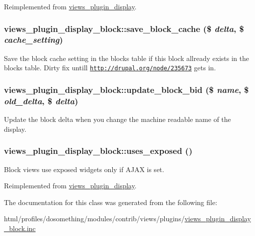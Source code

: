 Reimplemented from \hyperlink{classviews__plugin__display_a7a2f2aeedfc14816815e3ce65a61aedf}{views\_\-plugin\_\-display}.\hypertarget{classviews__plugin__display__block_a58ba8f810894ad2e7c43c49552005ceb}{
\subsubsection[{save\_\-block\_\-cache}]{\setlength{\rightskip}{0pt plus 5cm}views\_\-plugin\_\-display\_\-block::save\_\-block\_\-cache (\$ {\em delta}, \/  \$ {\em cache\_\-setting})}}
\label{classviews__plugin__display__block_a58ba8f810894ad2e7c43c49552005ceb}
Save the block cache setting in the blocks table if this block allready exists in the blocks table. Dirty fix untill \href{http://drupal.org/node/235673}{\tt http://drupal.org/node/235673} gets in. \hypertarget{classviews__plugin__display__block_a7c66bc2e467112a09d809d9d5d2baa20}{
\subsubsection[{update\_\-block\_\-bid}]{\setlength{\rightskip}{0pt plus 5cm}views\_\-plugin\_\-display\_\-block::update\_\-block\_\-bid (\$ {\em name}, \/  \$ {\em old\_\-delta}, \/  \$ {\em delta})}}
\label{classviews__plugin__display__block_a7c66bc2e467112a09d809d9d5d2baa20}
Update the block delta when you change the machine readable name of the display. \hypertarget{classviews__plugin__display__block_ab0995994a4c7436de2790c7ad8d7ea74}{
\subsubsection[{uses\_\-exposed}]{\setlength{\rightskip}{0pt plus 5cm}views\_\-plugin\_\-display\_\-block::uses\_\-exposed ()}}
\label{classviews__plugin__display__block_ab0995994a4c7436de2790c7ad8d7ea74}
Block views use exposed widgets only if AJAX is set. 

Reimplemented from \hyperlink{classviews__plugin__display_a5bfcb22187618f52bea9ea626aff18a4}{views\_\-plugin\_\-display}.

The documentation for this class was generated from the following file:\begin{DoxyCompactItemize}
\item 
html/profiles/dosomething/modules/contrib/views/plugins/\hyperlink{views__plugin__display__block_8inc}{views\_\-plugin\_\-display\_\-block.inc}\end{DoxyCompactItemize}
